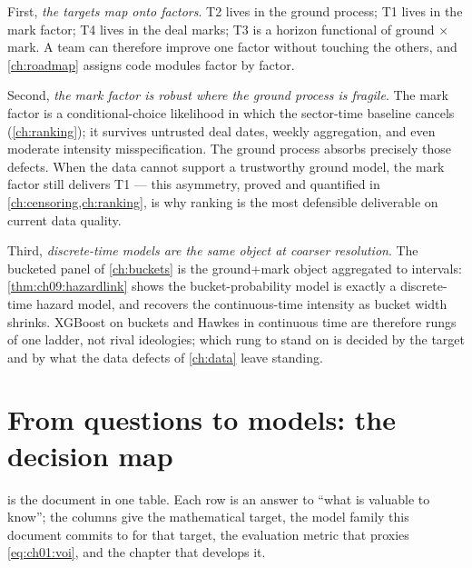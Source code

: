 First, \emph{the targets map onto factors}. T2 lives in the ground process;
T1 lives in the mark factor; T4 lives in the deal marks; T3 is a horizon
functional of ground $\times$ mark. A team can therefore improve one factor
without touching the others, and \cref{ch:roadmap} assigns code modules
factor by factor.

Second, \emph{the mark factor is robust where the ground process is
fragile}. The mark factor is a conditional-choice likelihood in which the
sector-time baseline cancels (\cref{ch:ranking}); it survives untrusted
deal dates, weekly aggregation, and even moderate intensity misspecification.
The ground process absorbs precisely those defects. When the data cannot
support a trustworthy ground model, the mark factor still delivers T1 ---
this asymmetry, proved and quantified in
\cref{ch:censoring,ch:ranking}, is why ranking is the most defensible
deliverable on current data quality.

Third, \emph{discrete-time models are the same object at coarser
resolution}. The bucketed panel of \cref{ch:buckets} is the ground+mark
object aggregated to intervals: \cref{thm:ch09:hazardlink} shows the
bucket-probability model is exactly a discrete-time hazard model, and
recovers the continuous-time intensity as bucket width shrinks. XGBoost on
buckets and Hawkes in continuous time are therefore rungs of one ladder,
not rival ideologies; which rung to stand on is decided by the target and
by what the data defects of \cref{ch:data} leave standing.

\section{From questions to models: the decision map}\label{ch01:sec:map}

 is the document in one table. Each row is an answer to
``what is valuable to know''; the columns give the mathematical target, the
model family this document commits to for that target, the evaluation
metric that proxies \cref{eq:ch01:voi}, and the chapter that develops it.

